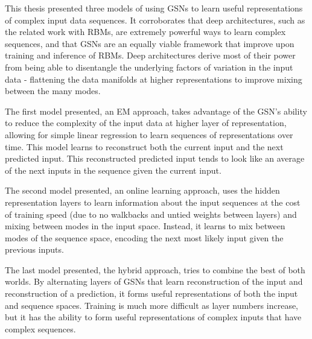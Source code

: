 This thesis presented three models of using GSNs to learn useful representations of complex input data sequences. It corroborates that deep architectures, such as the related work with RBMs, are extremely powerful ways to learn complex sequences, and that GSNs are an equally viable framework that improve upon training and inference of RBMs. Deep architectures derive most of their power from being able to disentangle the underlying factors of variation in the input data - flattening the data manifolds at higher representations to improve mixing between the many modes.

The first model presented, an EM approach, takes advantage of the GSN's ability to reduce the complexity of the input data at higher layer of representation, allowing for simple linear regression to learn sequences of representations over time. This model learns to reconstruct both the current input and the next predicted input. This reconstructed predicted input tends to look like an average of the next inputs in the sequence given the current input.

The second model presented, an online learning approach, uses the hidden representation layers to learn information about the input sequences at the cost of training speed (due to no walkbacks and untied weights between layers) and mixing between modes in the input space. Instead, it learns to mix between modes of the sequence space, encoding the next most likely input given the previous inputs.

The last model presented, the hybrid approach, tries to combine the best of both worlds. By alternating layers of GSNs that learn reconstruction of the input and reconstruction of a prediction, it forms useful representations of both the input and sequence spaces. Training is much more difficult as layer numbers increase, but it has the ability to form useful representations of complex inputs that have complex sequences.